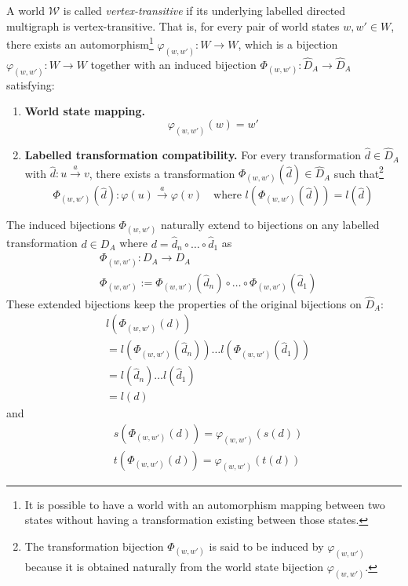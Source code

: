 \begin{definition}
A world $\mathscr{W}$ is called \emph{vertex-transitive} if its underlying labelled directed multigraph is vertex-transitive.
That is, for every pair of world states $w, w' \in W$, there exists an automorphism\footnote{
It is possible to have a world with an automorphism mapping between two states without having a transformation existing between those states.
} $\varphi_{(w,w')}: W \to W$, which is a bijection $\varphi_{(w,w')}: W \to W$ together with an induced bijection $\Phi_{(w, w')}: \hat{D}_{A} \to \hat{D}_{A}$ satisfying:
\begin{enumerate}[(1)]
    \item \textbf{World state mapping.}
    \begin{equation}
        \varphi_{(w,w')}(w) = w'
    \end{equation}
    \item \textbf{Labelled transformation compatibility.}
    For every transformation $\hat{d} \in \hat{D}_{A}$ with $\hat{d}: u \xrightarrow{a} v$, there exists a transformation $\Phi_{(w, w')}(\hat{d}) \in \hat{D}_{A}$ such that\footnote{
    The transformation bijection $\Phi_{(w, w')}$ is said to be induced by $\varphi_{(w,w')}$ because it is obtained naturally from the world state bijection $\varphi_{(w,w')}$.
    }
    \begin{equation}
        \Phi_{(w, w')}(\hat{d}): \varphi(u) \xrightarrow{a} \varphi(v) \quad \text{where $l(\Phi_{(w, w')}(\hat{d})) = l(\hat{d})$}
    \end{equation}
\end{enumerate}
\end{definition}

The induced bijections $\Phi_{(w, w')}$ naturally extend to bijections on any labelled transformation $d \in D_{A}$ where $d = \hat{d}_{n} \circ \dots \circ \hat{d}_{1}$ as
\begin{align}
    & \Phi_{(w, w')}: D_{A} \to D_{A} \\
    & \Phi_{(w, w')} := \Phi_{(w, w')}(\hat{d}_{n}) \circ \dots \circ \Phi_{(w, w')}(\hat{d}_{1})
\end{align}
These extended bijections keep the properties of the original bijections on $\hat{D}_{A}$:
\begin{align}
    & l(\Phi_{(w, w')}(d)) \\
    & = l(\Phi_{(w, w')}(\hat{d}_{n})) \dots l(\Phi_{(w, w')}(\hat{d}_{1})) \\
    & = l(\hat{d}_{n}) \dots l(\hat{d}_{1}) \\
    & = l(d)
\end{align}
and
\begin{align}
    & s(\Phi_{(w, w')}(d)) = \varphi_{(w,w')}(s(d)) \\
    & t(\Phi_{(w, w')}(d)) = \varphi_{(w,w')}(t(d))
\end{align}




